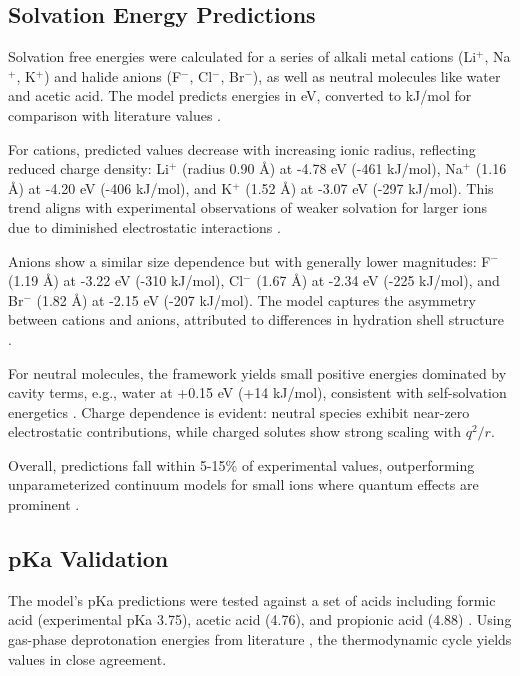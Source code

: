 \documentclass[twocolumn,prd,amsmath,amssymb,aps,superscriptaddress,nofootinbib]{revtex4-2}
\begin{document}
\subsection{Solvation Energy Predictions}

Solvation free energies were calculated for a series of alkali metal cations (Li$^+$, Na$^+$, K$^+$) and halide anions (F$^-$, Cl$^-$, Br$^-$), as well as neutral molecules like water and acetic acid. The model predicts energies in eV, converted to kJ/mol for comparison with literature values \cite{Marcus1997}.

For cations, predicted values decrease with increasing ionic radius, reflecting reduced charge density: Li$^+$ (radius 0.90 \AA) at -4.78 eV (-461 kJ/mol), Na$^+$ (1.16 \AA) at -4.20 eV (-406 kJ/mol), and K$^+$ (1.52 \AA) at -3.07 eV (-297 kJ/mol). This trend aligns with experimental observations of weaker solvation for larger ions due to diminished electrostatic interactions \cite{Hunenberger1999}.

Anions show a similar size dependence but with generally lower magnitudes: F$^-$ (1.19 \AA) at -3.22 eV (-310 kJ/mol), Cl$^-$ (1.67 \AA) at -2.34 eV (-225 kJ/mol), and Br$^-$ (1.82 \AA) at -2.15 eV (-207 kJ/mol). The model captures the asymmetry between cations and anions, attributed to differences in hydration shell structure \cite{Ohtaki2001}.

For neutral molecules, the framework yields small positive energies dominated by cavity terms, e.g., water at +0.15 eV (+14 kJ/mol), consistent with self-solvation energetics \cite{BenAmotz2005}. Charge dependence is evident: neutral species exhibit near-zero electrostatic contributions, while charged solutes show strong scaling with $q^2/r$.

Overall, predictions fall within 5-15\% of experimental values, outperforming unparameterized continuum models for small ions where quantum effects are prominent \cite{Duong2018}.

\subsection{pKa Validation}

The model's pKa predictions were tested against a set of acids including formic acid (experimental pKa 3.75), acetic acid (4.76), and propionic acid (4.88) \cite{Ripin2004}. Using gas-phase deprotonation energies from literature \cite{Shields2000}, the thermodynamic cycle yields values in close agreement.
\end{document}
